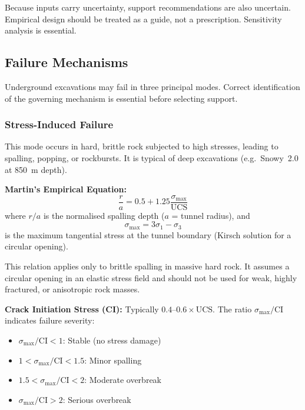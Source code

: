 \documentclass[a4paper,12pt]{article}
\begin{document}
\begin{warnbox}
Because inputs carry uncertainty, support recommendations are also uncertain. Empirical design should be treated as a guide, not a prescription. Sensitivity analysis is essential.
\end{warnbox}

\subsection{Failure Mechanisms}
Underground excavations may fail in three principal modes. Correct identification of the governing mechanism is essential before selecting support.

\subsubsection{Stress-Induced Failure}
This mode occurs in hard, brittle rock subjected to high stresses, leading to spalling, popping, or rockbursts. It is typical of deep excavations (e.g.\ Snowy~2.0 at 850~m depth).

\textbf{Martin's Empirical Equation:}
\[
\boxed{\frac{r}{a} = 0.5 + 1.25 \frac{\sigma_{\max}}{\mathrm{UCS}}}
\]
where $r/a$ is the normalised spalling depth ($a$ = tunnel radius), and
\[
\sigma_{\max} = 3\sigma_1 - \sigma_3
\]
is the maximum tangential stress at the tunnel boundary (Kirsch solution for a circular opening).

\begin{warnbox}
This relation applies only to brittle spalling in massive hard rock. It assumes a circular opening in an elastic stress field and should not be used for weak, highly fractured, or anisotropic rock masses.
\end{warnbox}

\textbf{Crack Initiation Stress (CI):} Typically $0.4$--$0.6 \times \mathrm{UCS}$. The ratio $\sigma_{\max}/\mathrm{CI}$ indicates failure severity:
\begin{itemize}
    \item $\sigma_{\max}/\mathrm{CI} < 1$: Stable (no stress damage)
    \item $1 < \sigma_{\max}/\mathrm{CI} < 1.5$: Minor spalling
    \item $1.5 < \sigma_{\max}/\mathrm{CI} < 2$: Moderate overbreak
    \item $\sigma_{\max}/\mathrm{CI} > 2$: Serious overbreak
\end{itemize}
\end{document}
